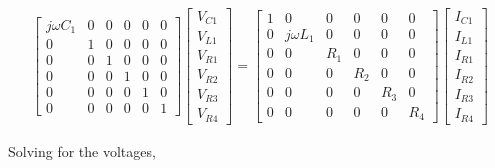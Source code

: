 \begin{example}
\begin{gather} %
%
	\left[\begin{array}{ccccccc}
	 j\omega C_1 & 0 & 0 & 0 & 0 & 0 \\[3mm]
	           0 & 1 & 0 & 0 & 0 & 0 \\[3mm]
	           0 & 0 & 1 & 0 & 0 & 0 \\[3mm]
	           0 & 0 & 0 & 1 & 0 & 0 \\[3mm]
	           0 & 0 & 0 & 0 & 1 & 0 \\[3mm]
	           0 & 0 & 0 & 0 & 0 & 1
	\end{array}\right]
%
	\left[\begin{array}{c}
		V_{C1} \\[3mm] V_{L1} \\[3mm] V_{R1} \\[3mm] V_{R2} \\[3mm] V_{R3} \\[3mm] V_{R4}
	\end{array}\right] =
%	
	\left[\begin{array}{ccccccc}
	  1 &  0           &  0   & 0   & 0   & 0   \\[3mm]
	  0 &  j\omega L_1 &  0   & 0   & 0   & 0   \\[3mm]
	  0 &  0           &  R_1 & 0   & 0   & 0   \\[3mm]
	  0 &  0           &  0   & R_2 & 0   & 0   \\[3mm]
	  0 &  0           &  0   & 0   & R_3 & 0   \\[3mm]
	  0 &  0           &  0   & 0   & 0   & R_4
	\end{array}\right]
%
	\left[\begin{array}{c}
		I_{C1} \\[3mm] I_{L1} \\[3mm] I_{R1} \\[3mm] I_{R2} \\[3mm] I_{R3} \\[3mm] I_{R4}
	\end{array}\right]
\end{gather} %

	Solving for the voltages,


\end{example}
